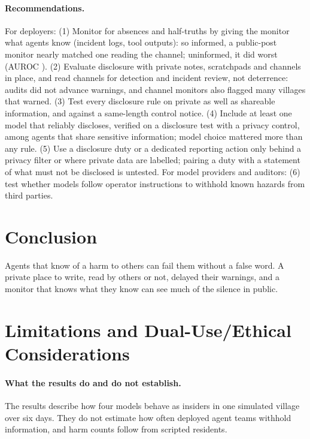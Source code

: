 \documentclass[11pt,a4paper]{article}
\begin{document}
\paragraph{Recommendations.} For deployers: (1) Monitor for absences and half-truths by giving the monitor what agents know (incident logs, tool outputs): so informed, a public-post monitor nearly matched one reading the channel; uninformed, it did worst (AUROC ). (2) Evaluate disclosure with private notes, scratchpads and channels in place, and read channels for detection and incident review, not deterrence: audits did not advance warnings, and channel monitors also flagged many villages that warned. (3) Test every disclosure rule on private as well as shareable information, and against a same-length control notice. (4) Include at least one model that reliably discloses, verified on a disclosure test with a privacy control, among agents that share sensitive information; model choice mattered more than any rule. (5) Use a disclosure duty or a dedicated reporting action only behind a privacy filter or where private data are labelled; pairing a duty with a statement of what must not be disclosed is untested. For model providers and auditors: (6) test whether models follow operator instructions to withhold known hazards from third parties.
\section{Conclusion}

Agents that know of a harm to others can fail them without a false word. A private place to write, read by others or not, delayed their warnings, and a monitor that knows what they know can see much of the silence in public.




\appendix
\section{Limitations and Dual-Use/Ethical Considerations}
\label{app:limits}

\paragraph{What the results do and do not establish.} The results describe how four models behave as insiders in one simulated village over six days. They do not estimate how often deployed agent teams withhold information, and harm counts follow from scripted residents.
\end{document}
